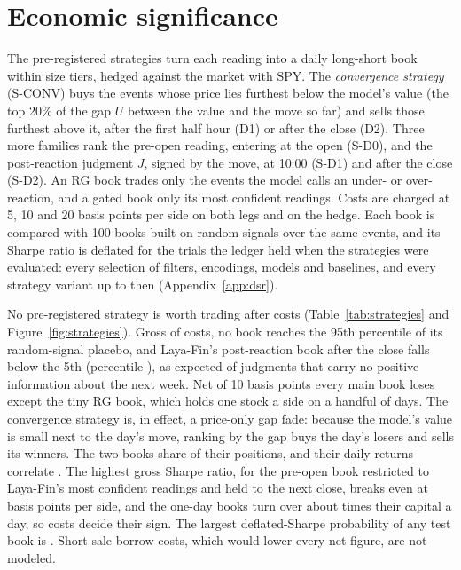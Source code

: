 \section{Economic significance}\label{sec:strategies}

The pre-registered strategies turn each reading into a daily long-short book within size tiers, hedged against
the market with SPY. The \emph{convergence strategy} (S-CONV) buys the events whose price lies furthest below the
model's value (the top 20\% of the gap $U$ between the value and the move so far) and sells those furthest above
it, after the first half hour (D1) or after the close (D2). Three more families rank the pre-open reading,
entering at the open (S-D0), and the post-reaction judgment $J$, signed by the move, at 10:00 (S-D1) and after the
close (S-D2). An RG book trades only the events the model calls an under- or over-reaction, and a gated book only
its most confident readings. Costs are charged at 5, 10 and 20 basis points per side on both legs and on the
hedge. Each book is compared with 100 books built on random signals over the same events, and its Sharpe ratio is
deflated \citep{bailey2014} for the  trials the ledger held when the strategies were evaluated:
every selection of filters, encodings, models and baselines, and every strategy variant up to then
(Appendix~\ref{app:dsr}).

No pre-registered strategy is worth trading after costs (Table~\ref{tab:strategies} and
Figure~\ref{fig:strategies}). Gross of costs, no book reaches the 95th percentile of its random-signal placebo,
and Laya-Fin's post-reaction book after the close falls below the 5th (percentile ), as expected
of judgments that carry no positive information about the next week. Net of 10 basis points every main book
loses except the tiny RG book, which holds one stock a side on a handful of days. The convergence strategy is, in
effect, a price-only gap fade: because the model's value is small next to the day's move, ranking by the gap buys
the day's losers and sells its winners. The two books share  of their positions, and their
daily returns correlate . The highest gross Sharpe ratio,  for the pre-open
book restricted to Laya-Fin's most confident readings and held to the next close, breaks even at
 basis points per side, and the one-day books turn over about  times their
capital a day, so costs decide their sign. The largest deflated-Sharpe probability of any test book is
. Short-sale borrow costs, which would lower every net figure, are not modeled.

